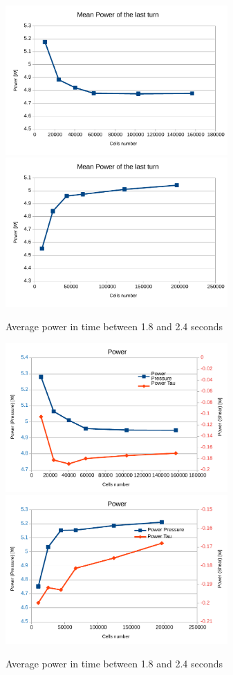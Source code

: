 \documentclass[a4paper,12pt]{article}
\begin{document}
\begin{figure}[htbp]
\centering
\includegraphics[width=8.5cm]{images/meshsensitivity/power-noregion} 
\includegraphics[width=8.5cm]{images/meshsensitivity/power-region} 
\caption{Average power in time between 1.8 and 2.4 seconds}
\label{fig:meshsensityvity-power}
\end{figure}

\begin{figure}[htbp]
\centering
\includegraphics[width=8.5cm]{images/meshsensitivity/power-ptau-noregion} 
\includegraphics[width=8.5cm]{images/meshsensitivity/power-ptau-region} 
\caption{Average power in time between 1.8 and 2.4 seconds}
\label{fig:meshsensityvity-power-ptau}
\end{figure}
\end{document}
